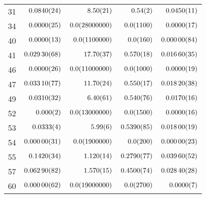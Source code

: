 \begin{tabular}{l|r|r|r|r}
31 & $\num{0.084+-0.0024}$ & $\num{8.5+-0.21}$ & $\num{0.54+-0.02}$ & $\num{0.045+-0.0011}$ \\
34 & $\num{0.0+-0.0025}$ & $\num{0+-2800000.0}$ & $\num{0+-110.0}$ & $\num{0.0+-0.0017}$ \\
40 & $\num{0.0+-0.0013}$ & $\num{0+-110000.0}$ & $\num{0+-16.0}$ & $\num{0.0+-0.00084}$ \\
41 & $\num{0.0293+-0.00068}$ & $\num{17.7+-0.37}$ & $\num{0.57+-0.018}$ & $\num{0.0166+-0.00035}$ \\
46 & $\num{0.0+-0.0026}$ & $\num{0+-1100000.0}$ & $\num{0+-100.0}$ & $\num{0.0+-0.0019}$ \\
47 & $\num{0.0331+-0.00077}$ & $\num{11.7+-0.24}$ & $\num{0.55+-0.017}$ & $\num{0.0182+-0.00038}$ \\
49 & $\num{0.031+-0.0032}$ & $\num{6.4+-0.61}$ & $\num{0.54+-0.076}$ & $\num{0.017+-0.0016}$ \\
52 & $\num{0.0+-0.002}$ & $\num{0+-1300000.0}$ & $\num{0+-150.0}$ & $\num{0.0+-0.0016}$ \\
53 & $\num{0.0333+-0.0004}$ & $\num{5.99+-0.06}$ & $\num{0.539+-0.0085}$ & $\num{0.018+-0.00019}$ \\
54 & $\num{0.0+-0.00031}$ & $\num{0+-190000.0}$ & $\num{0+-20.0}$ & $\num{0.0+-0.00023}$ \\
55 & $\num{0.142+-0.0034}$ & $\num{1.12+-0.014}$ & $\num{0.279+-0.0077}$ & $\num{0.0396+-0.00052}$ \\
57 & $\num{0.0629+-0.00082}$ & $\num{1.57+-0.015}$ & $\num{0.45+-0.0074}$ & $\num{0.0284+-0.00028}$ \\
60 & $\num{0.0+-0.00062}$ & $\num{0+-1900000.0}$ & $\num{0+-270.0}$ & $\num{0.0+-0.0007}$ \\
\end{tabular}
